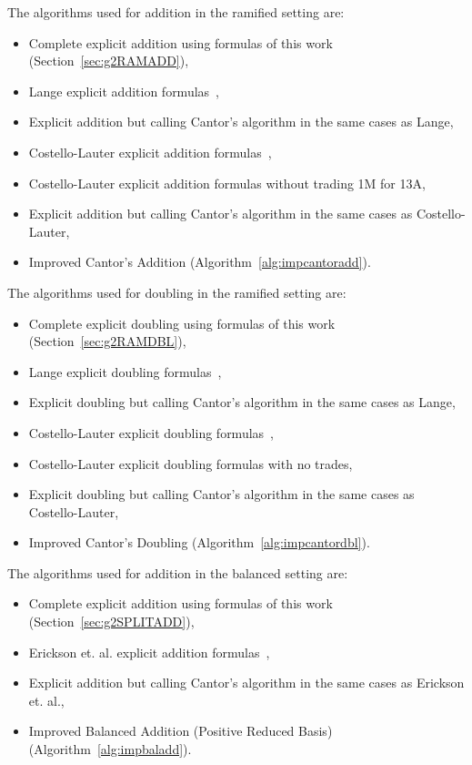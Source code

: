 The algorithms used for addition in the ramified setting are: 
\begin{itemize}
    \item Complete explicit addition using formulas of this work (Section~\ref{sec:g2RAMADD}),
    \item Lange explicit addition formulas~\cite{Lange_explicit_2005},
    \item Explicit addition but calling Cantor's algorithm in the same cases as Lange,
    \item Costello-Lauter explicit addition formulas~\cite{CostelloLauter_geo_2011},
    \item Costello-Lauter explicit addition formulas without trading 1M for 13A,
    \item Explicit addition but calling Cantor's algorithm in the same cases as Costello-Lauter,
    \item Improved Cantor's Addition (Algorithm~\ref{alg:impcantoradd}).
\end{itemize} 
The algorithms used for doubling in the ramified setting are: 
\begin{itemize}
    \item Complete explicit doubling using formulas of this work (Section~\ref{sec:g2RAMDBL}),
    \item Lange explicit doubling formulas~\cite{Lange_explicit_2005},
    \item Explicit doubling but calling Cantor's algorithm in the same cases as Lange,
    \item Costello-Lauter explicit doubling formulas~\cite{CostelloLauter_geo_2011},
    \item Costello-Lauter explicit doubling formulas with no trades,
    \item Explicit doubling but calling Cantor's algorithm in the same cases as Costello-Lauter,
    \item Improved Cantor's Doubling (Algorithm~\ref{alg:impcantordbl}).
\end{itemize} 
The algorithms used for addition in the balanced setting are: 
\begin{itemize}
    \item Complete explicit addition using formulas of this work (Section~\ref{sec:g2SPLITADD}),
    \item Erickson et. al. explicit addition formulas~\cite{EricksonJacobsonStein_realg2_2011},
    \item Explicit addition but calling Cantor's algorithm in the same cases as Erickson et. al.,
    \item Improved Balanced Addition (Positive Reduced Basis) (Algorithm~\ref{alg:impbaladd}).
\end{itemize} 
